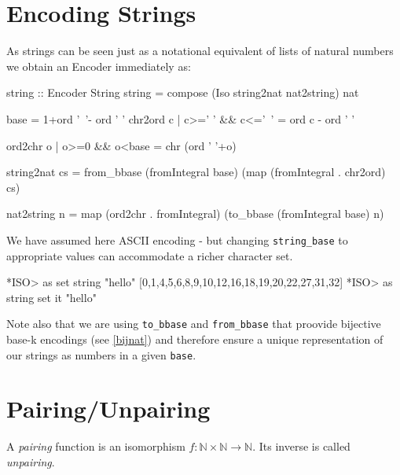 \documentclass[]{INCLUDES/llncs}
\begin{document}
\section{Encoding Strings}
As strings can be seen just as a notational equivalent
of lists of natural numbers 
we obtain an Encoder immediately as: 
\begin{code}
string :: Encoder String
string = compose (Iso string2nat nat2string) nat

base = 1+ord '~'- ord ' '
chr2ord c | c>=' ' && c<='~' = ord c - ord ' '

ord2chr o | o>=0 && o<base = chr (ord ' '+o)

string2nat cs = from_bbase 
  (fromIntegral base) 
  (map (fromIntegral . chr2ord) cs)

nat2string n = map 
  (ord2chr . fromIntegral) 
  (to_bbase (fromIntegral base) n)
\end{code}
We have assumed here ASCII encoding - but changing {\tt string\_base} to
appropriate values can accommodate a richer character set.
\begin{codex}
*ISO> as set string "hello"
[0,1,4,5,6,8,9,10,12,16,18,19,20,22,27,31,32]
*ISO> as string set it
"hello"
\end{codex}
Note also that we are using {\tt to\_bbase} and {\tt from\_bbase} that proovide
bijective base-k encodings (see \ref{bijnat}) and therefore ensure a unique
representation of our strings as numbers in a given {\tt base}.

\section{Pairing/Unpairing} \label{pairings}

A {\em pairing} function is an isomorphism $f:\mathbb{N} \times \mathbb{N}
\rightarrow \mathbb{N}$. Its inverse is called {\em unpairing}.
\end{document}
